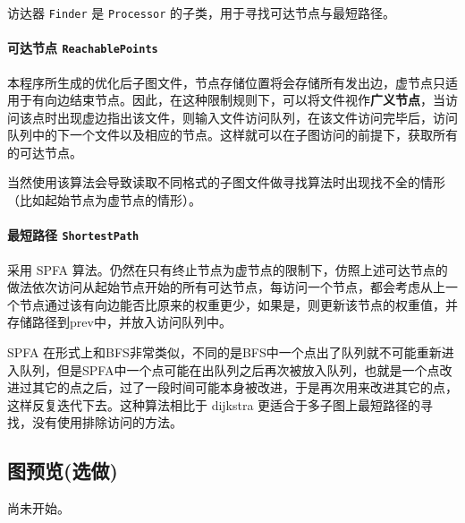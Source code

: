 \documentclass[
]{article}
\begin{document}
访达器 \texttt{Finder} 是 \texttt{Processor}
的子类，用于寻找可达节点与最短路径。

\hypertarget{header-n208}{%
\paragraph{\texorpdfstring{可达节点
\texttt{ReachablePoints}}{可达节点 ReachablePoints}}\label{header-n208}}

本程序所生成的优化后子图文件，节点存储位置将会存储所有发出边，虚节点只适用于有向边结束节点。因此，在这种限制规则下，可以将文件视作\textbf{广义节点}，当访问该点时出现虚边指出该文件，则输入文件访问队列，在该文件访问完毕后，访问队列中的下一个文件以及相应的节点。这样就可以在子图访问的前提下，获取所有的可达节点。

当然使用该算法会导致读取不同格式的子图文件做寻找算法时出现找不全的情形（比如起始节点为虚节点的情形）。

\hypertarget{header-n211}{%
\paragraph{\texorpdfstring{最短路径
\texttt{ShortestPath}}{最短路径 ShortestPath}}\label{header-n211}}

采用 SPFA
算法。仍然在只有终止节点为虚节点的限制下，仿照上述可达节点的做法依次访问从起始节点开始的所有可达节点，每访问一个节点，都会考虑从上一个节点通过该有向边能否比原来的权重更少，如果是，则更新该节点的权重值，并存储路径到prev中，并放入访问队列中。

SPFA
在形式上和BFS非常类似，不同的是BFS中一个点出了队列就不可能重新进入队列，但是SPFA中一个点可能在出队列之后再次被放入队列，也就是一个点改进过其它的点之后，过了一段时间可能本身被改进，于是再次用来改进其它的点，这样反复迭代下去。这种算法相比于
dijkstra 更适合于多子图上最短路径的寻找，没有使用排除访问的方法。

\hypertarget{header-n214}{%
\subsection{图预览(选做)}\label{header-n214}}

尚未开始。
\end{document}
